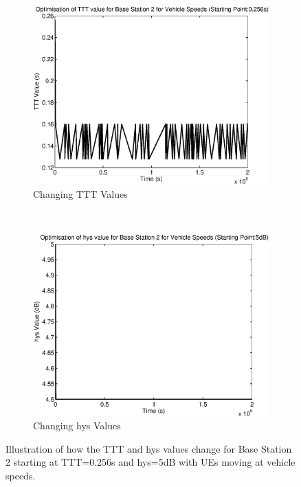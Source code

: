 \begin{figure}[H]
        \centering
        \begin{subfigure}[b]{0.49\textwidth}
                \includegraphics[width=\textwidth]{figures/graphs/vehmid/TTT2.eps}
                \caption{Changing TTT Values}
        \end{subfigure}%
        ~ %
        \begin{subfigure}[b]{0.49\textwidth}
                \includegraphics[width=\textwidth]{figures/graphs/vehmid/hys2.eps}
                \caption{Changing hys Values}
        \end{subfigure}
        \caption{Illustration of how the TTT and hys values change for Base Station 2 starting at TTT=0.256s and hys=5dB with UEs moving at vehicle speeds.}
\end{figure}
